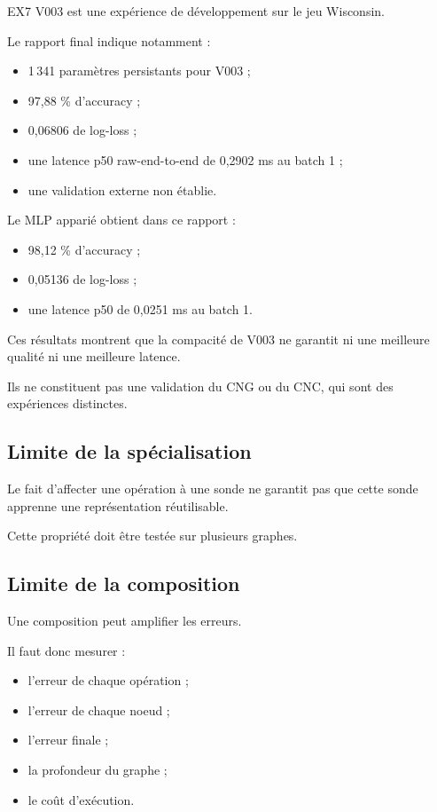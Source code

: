 \documentclass[11pt,a4paper]{article}
\begin{document}
EX7 V003 est une expérience de développement
sur le jeu Wisconsin.

Le rapport final indique notamment :
\begin{itemize}
    \item 1\,341 paramètres persistants pour V003 ;
    \item 97,88 \% d'accuracy ;
    \item 0,06806 de log-loss ;
    \item une latence p50 raw-end-to-end de 0,2902 ms
    au batch 1 ;
    \item une validation externe non établie.
\end{itemize}

Le MLP apparié obtient dans ce rapport :
\begin{itemize}
    \item 98,12 \% d'accuracy ;
    \item 0,05136 de log-loss ;
    \item une latence p50 de 0,0251 ms au batch 1.
\end{itemize}

Ces résultats montrent que la compacité de V003
ne garantit ni une meilleure qualité ni une meilleure
latence.

Ils ne constituent pas une validation du CNG ou du CNC,
qui sont des expériences distinctes.

\subsection{Limite de la spécialisation}

Le fait d'affecter une opération à une sonde ne garantit
pas que cette sonde apprenne une représentation
réutilisable.

Cette propriété doit être testée sur plusieurs graphes.

\subsection{Limite de la composition}

Une composition peut amplifier les erreurs.

Il faut donc mesurer :
\begin{itemize}
    \item l'erreur de chaque opération ;
    \item l'erreur de chaque noeud ;
    \item l'erreur finale ;
    \item la profondeur du graphe ;
    \item le coût d'exécution.
\end{itemize}
\end{document}
